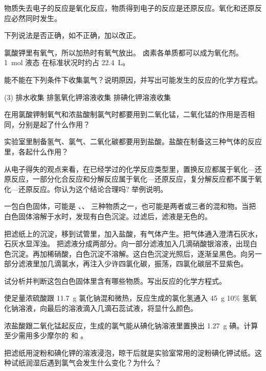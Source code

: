 物质失去电子的反应是氧化反应，物质得到电子的反应是还原反应。氧化和还原反应必然同时发生。
\begin{Review}
  \begin{question}
    \item 下列说法是否正确，如不正确，加以改正。
    \begin{tasks}
      \task 氯酸钾里有氧气，所以加热时有氧气放出。
      \task 卤素各单质都可以成为氧化剂。
      \task \qty{1}{mol} 液态  在标准状况时约占 \qty{22.4}{L}。
    \end{tasks}
    \item 能不能在下列条件下收集氯气？说明原因，并写出可能发生的反应的化学方程式。
    \begin{tasks}(3)
      \task 排水收集
      \task 排氢氧化钾溶液收集
      \task 排碘化钾溶液收集
    \end{tasks}
    \item 在用氯酸钾制氧气和浓盐酸制氯气时都要用到二氧化锰，二氧化锰的作用是否相同，分别是起了什么作用？
    \item 实验室里制备氢气、氯气、二氧化碳都要用到盐酸。盐酸在制备这三种气体的反应里，各起什么作用？
    \item 从电子得失的观点来看，在已经学过的化学反应类型里，置换反应都属于氧化—还原反应，一部分化合反应和分解反应属于氧化—还原反应，复分解反应都不属于氧化—还原反应。你认为这个结论合理吗? 举例说明。
    \item 一包白色固体，可能是 、、 三种物质之一，也可能是两者或三者的混和物。当把白色固体溶解于水时，发现有白色沉淀。过滤后，滤液是无色的。
    \begin{tasks}
      \task 把滤纸上的沉淀，移到试管里，加入盐酸，有气体产生。把气体通入澄清石灰水，石灰水显浑浊。
      \task 把滤液分成两部分。向一部分滤液加入几滴硝酸银溶液，出现白色沉淀。再加稀硝酸，白色沉淀不溶解。这白色沉淀光照后，逐渐呈黑色。向另一部分滤液里加几滴氯水，再注入少许四氯化碳，振荡，四氯化碳层不显紫色。
    \end{tasks}
    试分析并判断这包白色固体里含有哪些物质。写出反应的化学方程式。
    \item 使足量浓硫酸跟 \qty{11.7}{g} 氯化钠混和微热，反应生成的氯化氢通入 \qty{45}{g} 10\% 氢氧化钠溶液，向最后的溶液滴入几滴石蕊试液，将显什么颜色。
    \item 浓盐酸跟二氧化锰起反应，生成的氯气能从碘化钠溶液里置换出 \qty{1.27}{g} 碘。计算至少需用多少摩尔的  和  。
    \item 把滤纸用淀粉和碘化钾的溶液浸泡，晾干后就是实验室常用的淀粉碘化钾试纸。这种试纸润湿后遇到氯气会发生什么变化？为什么？
  \end{question}
\end{Review}